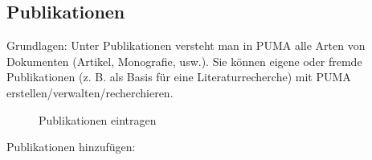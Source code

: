\subsection{Publikationen}
Grundlagen:
\newline
Unter Publikationen versteht man in PUMA alle Arten von Dokumenten (Artikel, Monografie, usw.). Sie können eigene oder fremde Publikationen (z. B. als Basis für eine Literaturrecherche) mit PUMA erstellen/verwalten/recherchieren. 
\begin{figure}[h!]
 \centering
 \caption{Publikationen eintragen}
 \label{figure3}
\end{figure}  
Publikationen hinzufügen:

